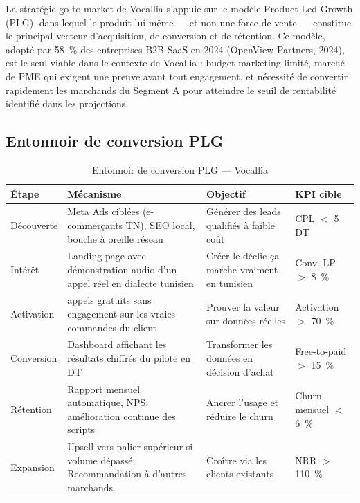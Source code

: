 La stratégie go-to-market de Vocallia s'appuie sur le modèle Product-Led Growth (PLG), dans lequel le produit lui-même --- et non une force de vente --- constitue le principal vecteur d'acquisition, de conversion et de rétention. Ce modèle, adopté par 58~\% des entreprises B2B SaaS en 2024 (OpenView Partners, 2024), est le seul viable dans le contexte de Vocallia : budget marketing limité, marché de PME qui exigent une preuve avant tout engagement, et nécessité de convertir rapidement les marchands du Segment A pour atteindre le seuil de rentabilité identifié dans les projections.

\subsection{Entonnoir de conversion PLG}
\label{section3.7.1}

\begin{table}[H]
\centering
\caption{Entonnoir de conversion PLG --- Vocallia}
\vspace{4pt}
\begin{tabularx}{\textwidth}{|>{\raggedright\arraybackslash}p{2cm}|>{\raggedright\arraybackslash}X|>{\raggedright\arraybackslash}X|>{\raggedright\arraybackslash}p{2.2cm}|}
\hline
\textbf{Étape} & \textbf{Mécanisme} & \textbf{Objectif} & \textbf{KPI cible} \\
\hline
Découverte & Meta Ads ciblées (e-commerçants TN), SEO local, bouche à oreille réseau & Générer des leads qualifiés à faible coût & CPL $<$ 5 DT \\
\hline
Intérêt & Landing page avec démonstration audio d'un appel réel en dialecte tunisien & Créer le déclic \og{}ça marche vraiment en tunisien\fg{} & Conv. LP $>$ 8~\% \\
\hline
Activation & 50 appels gratuits sans engagement sur les vraies commandes du client & Prouver la valeur sur données réelles & Activation $>$ 70~\% \\
\hline
Conversion & Dashboard affichant les résultats chiffrés du pilote en DT & Transformer les données en décision d'achat & Free-to-paid $>$ 15~\% \\
\hline
Rétention & Rapport mensuel automatique, NPS, amélioration continue des scripts & Ancrer l'usage et réduire le churn & Churn mensuel $<$ 6~\% \\
\hline
Expansion & Upsell vers palier supérieur si volume dépassé. Recommandation à d'autres marchands. & Croître via les clients existants & NRR $>$ 110~\% \\
\hline
\end{tabularx}
\end{table}


